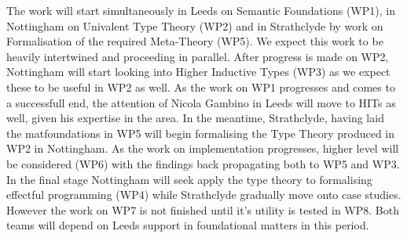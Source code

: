 \documentclass[a4paper,11pt]{article}
\begin{document}
\bigskip
The work will start simultaneously in Leeds on Semantic
Foundations (WP1), in Nottingham on Univalent Type Theory (WP2) and in
Strathclyde by work on Formalisation of the required Meta-Theory
(WP5). We expect this work to be heavily intertwined and proceeding in
parallel. After progress is made on WP2, Nottingham will start looking
into Higher Inductive Types (WP3) as we expect these to be useful in
WP2 as well. As the work on WP1 progresses and comes to a successfull
end, the attention of Nicola Gambino in Leeds will move to HITs as
well, given his expertise in the area. In the meantime, Strathclyde,
having laid the matfoundations in WP5 will begin formalising the Type
Theory produced in WP2 in Nottingham. As the work on implementation
progresses, higher level will be considered (WP6) with the findings
back propagating both to WP5 and WP3. In the final stage Nottingham
will seek apply the type theory to formalising effectful programming
(WP4) while Strathclyde gradually move onto case studies. However the
work on WP7 is not finished until it's utility is tested in WP8. Both
teams will depend on Leeds support in foundational matters in this period. 
\end{document}
